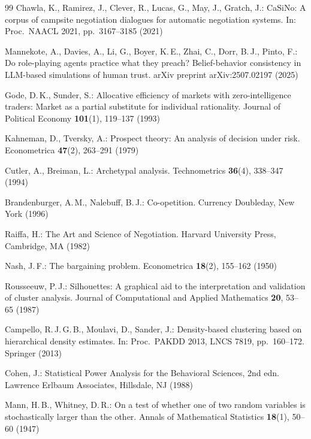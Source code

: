 \documentclass[runningheads]{llncs}
\begin{document}
\begin{thebibliography}{99}
Chawla, K., Ramirez, J., Clever, R., Lucas, G., May, J., Gratch, J.:
CaSiNo: A corpus of campsite negotiation dialogues for automatic
negotiation systems.
In: Proc.\ NAACL 2021, pp.~3167--3185 (2021)

Mannekote, A., Davies, A., Li, G., Boyer, K.\,E., Zhai, C., Dorr, B.\,J.,
Pinto, F.:
Do role-playing agents practice what they preach? Belief-behavior
consistency in LLM-based simulations of human trust.
arXiv preprint arXiv:2507.02197 (2025)

Gode, D.\,K., Sunder, S.:
Allocative efficiency of markets with zero-intelligence traders: Market
as a partial substitute for individual rationality.
Journal of Political Economy \textbf{101}(1), 119--137 (1993)

Kahneman, D., Tversky, A.:
Prospect theory: An analysis of decision under risk.
Econometrica \textbf{47}(2), 263--291 (1979)

Cutler, A., Breiman, L.:
Archetypal analysis.
Technometrics \textbf{36}(4), 338--347 (1994)

Brandenburger, A.\,M., Nalebuff, B.\,J.:
Co-opetition.
Currency Doubleday, New York (1996)

Raiffa, H.:
The Art and Science of Negotiation.
Harvard University Press, Cambridge, MA (1982)

Nash, J.\,F.:
The bargaining problem.
Econometrica \textbf{18}(2), 155--162 (1950)

Rousseeuw, P.\,J.:
Silhouettes: A graphical aid to the interpretation and validation of
cluster analysis.
Journal of Computational and Applied Mathematics \textbf{20}, 53--65
(1987)

Campello, R.\,J.\,G.\,B., Moulavi, D., Sander, J.:
Density-based clustering based on hierarchical density estimates.
In: Proc.\ PAKDD 2013, LNCS 7819, pp.~160--172. Springer (2013)

Cohen, J.:
Statistical Power Analysis for the Behavioral Sciences, 2nd edn.
Lawrence Erlbaum Associates, Hillsdale, NJ (1988)

Mann, H.\,B., Whitney, D.\,R.:
On a test of whether one of two random variables is stochastically
larger than the other.
Annals of Mathematical Statistics \textbf{18}(1), 50--60 (1947)


\end{thebibliography}
\end{document}

